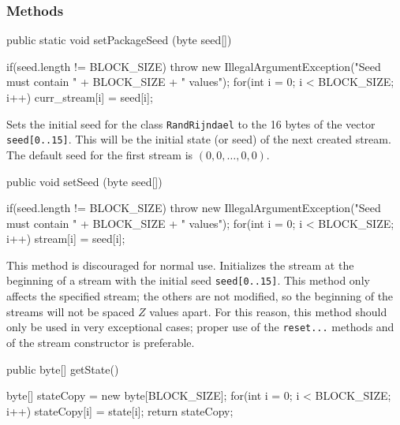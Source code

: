 \subsubsection* {Methods}
\begin{code}
   public static void setPackageSeed (byte seed[]) \begin{hide} {
      if(seed.length != BLOCK_SIZE)
         throw new IllegalArgumentException("Seed must contain " +
                                            BLOCK_SIZE + " values");
      for(int i = 0; i < BLOCK_SIZE; i++)
         curr_stream[i] = seed[i];
   } \end{hide}
\end{code}
\begin{tabb} Sets the initial seed for the class \texttt{RandRijndael} to the
  16 bytes of the vector \texttt{seed[0..15]}.
  This will be the initial state (or seed) of the next created stream.
  The default seed for the first stream is $(0, 0, \ldots, 0, 0)$.
\end{tabb}
\begin{htmlonly}
\end{htmlonly}
\begin{code}

   public void setSeed (byte seed[]) \begin{hide} {
      if(seed.length != BLOCK_SIZE)
         throw new IllegalArgumentException("Seed must contain " +
                                            BLOCK_SIZE + " values");
      for(int i = 0; i < BLOCK_SIZE; i++)
         stream[i] = seed[i];
   } \end{hide}
\end{code}
\begin{tabb} This method is discouraged for normal use.
  Initializes the stream at the beginning of a stream with the initial 
  seed \texttt{seed[0..15]}.
  This method only affects the specified stream; the others are not modified,
  so the beginning of the streams will not be spaced $Z$ values apart.
  For this reason, this method should only be used in very 
  exceptional cases; proper use of the \texttt{reset...} methods
  and of the stream constructor is preferable.
\end{tabb}
\begin{htmlonly}
\end{htmlonly}
\begin{code}

   public byte[] getState() \begin{hide} {
      byte[] stateCopy = new byte[BLOCK_SIZE];
      for(int i = 0; i < BLOCK_SIZE; i++)
         stateCopy[i] = state[i];
      return stateCopy;
   } \end{hide}
\end{code}
